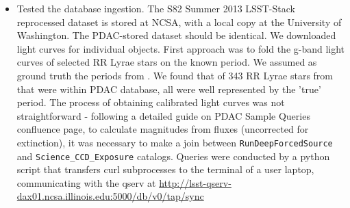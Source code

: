 \documentclass[DM,lsstdraft,toc,usenatbib]{lsstdoc}
\begin{document}
\begin{itemize}
	
    \item Tested the database ingestion. The S82 Summer 2013 LSST-Stack reprocessed dataset is stored at NCSA, with a local copy at the University of Washington.  The PDAC-stored dataset should be identical. We downloaded light curves for individual objects. First approach was to fold the g-band light curves of selected RR Lyrae stars on the known period.  We assumed as ground truth the periods from \cite{sesar2010}.  We found that of 343  RR Lyrae stars from \cite{sesar2010} that were within PDAC database,  all were well represented by the 'true' period.  The process of obtaining calibrated light curves was not straightforward  - following a detailed guide on PDAC Sample Queries confluence page,  to calculate magnitudes from fluxes (uncorrected for extinction), it was necessary to  make a join between \verb|RunDeepForcedSource| and \verb|Science_CCD_Exposure| catalogs.  Queries were conducted by  a python script that transfers curl subprocesses to the terminal of a user laptop, communicating with the qserv  at \url{http://lsst-qserv-dax01.ncsa.illinois.edu:5000/db/v0/tap/sync}

 \end{itemize}   


%
 
\end{document}
